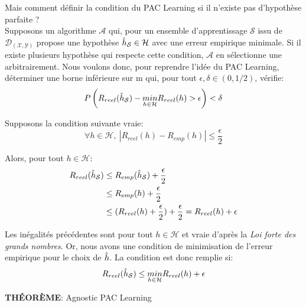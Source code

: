 \noindent Mais comment définir la condition du PAC Learning si il n'existe pas d'hypothèse parfaite ?\\

\noindent Supposons un algorithme $\mathcal{A}$ qui, pour un ensemble d'apprentissage $\mathcal{S}$ issu de $\mathcal{D}_{(\mathcal{X},\mathcal{Y})}$ propose une hypothèse $\Hat{h}_\mathcal{S} \in \mathcal{H}$ avec une erreur empirique minimale. Si il existe plusieurs hypothèse qui respecte cette condition, $\mathcal{A}$ en sélectionne une arbitrairement. Nous voulons donc, pour reprendre l'idée du PAC Learning, déterminer une borne inférieure sur m qui, pour tout $\epsilon, \delta \in (0,1/2)$, vérifie:
$$P \left(R_{reel}(\Hat{h}_\mathcal{S})-\underset{h \in \mathcal{H}}{min}R_{reel}(h) > \epsilon \right) < \delta$$

\noindent Supposons la condition suivante vraie:
$$\forall h \in \mathcal{H}, \ |R_{reel}(h)-R_{emp}(h)| \leq \frac{\epsilon}{2}$$

\noindent Alors, pour tout $h \in \mathcal{H}$:
\begin{align*}
R_{reel}(\Hat{h}_\mathcal{S}) & \leq R_{emp}(\Hat{h}_\mathcal{S}) + \frac{\epsilon}{2}\\
 & \leq R_{emp}(h) + \frac{\epsilon}{2}\\
 & \leq (R_{reel}(h) + \frac{\epsilon}{2}) + \frac{\epsilon}{2}= R_{reel}(h) + \epsilon
\end{align*}

\noindent Les inégalités précédentes sont pour tout $h \in \mathcal{H}$ et vraie d'après la \textit{Loi forte des grands nombres}. Or, nous avons une condition de minimisation de l'erreur empirique pour le choix de $\Hat{h}$. La condition est donc remplie si:
$$R_{reel}(\Hat{h}_\mathcal{S}) \leq \underset{h \in \mathcal{H}}{min}R_{reel}(h) + \epsilon$$

\noindent \textbf{THÉORÈME}: Agnostic PAC Learning\\

\\
\\

